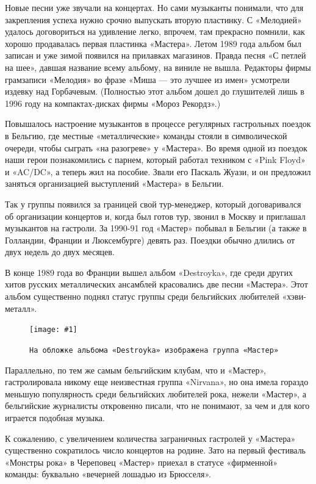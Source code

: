 \documentclass[10pt, twoside]{book}
\newcommand{\myincludegraphics}[1]{\texttt{[image: \#1]}}
\begin{document}
Новые песни уже звучали на концертах. Но сами музыканты понимали, что для закрепления успеха нужно срочно выпускать
вторую пластинку. С «Мелодией» удалось договориться на удивление легко, впрочем, там прекрасно помнили, как хорошо
продавалась первая пластинка «Мастера». Летом 1989 года альбом был записан и уже зимой появился на прилавках магазинов.
Правда песня «С петлей на шее», давшая название всему альбому, на виниле не вышла. Редакторы фирмы грамзаписи «Мелодия»
во фразе «Миша — это лучшее из имен» усмотрели издевку над Горбачевым. (Полностью этот альбом дошел до глушителей лишь в
1996 году на компактах-дисках фирмы «Мороз Рекордз».)

Повышалось настроение музыкантов в процессе регулярных гастрольных поездок в Бельгию, где местные «металлические»
команды стояли в символической очереди, чтобы сыграть «на разогреве» у «Мастера». Во время одной из поездок наши герои
познакомились с парнем, который работал техником с «Pink Floyd» и «AC/DC», а теперь жил на пособие. Звали его Паскаль
Жуази, и он предложил заняться организацией выступлений «Мастера» в Бельгии.

Так у группы появился за границей свой тур-менеджер, который договаривался об организации концертов и, когда был готов
тур, звонил в Москву и приглашал музыкантов на гастроли. За 1990-91 год «Мастер» побывал в Бельгии (а также в Голландии,
Франции и Люксембурге) девять раз. Поездки обычно длились от двух недель до двух месяцев.

В конце 1989 года во Франции вышел альбом «Destroyka», где среди других хитов русских металлических ансамблей
красовались две песни «Мастера». Этот альбом существенно поднял статус группы среди бельгийских любителей «хэви-металл».

\begin{figure}
    \centering
    \myincludegraphics{Image25}
    \caption{\texttt{На обложке альбома «Destroykа» изображена группа «Мастер»}}
\end{figure}

Параллельно, по тем же самым бельгийским клубам, что и «Мастер», гастролировала никому еще неизвестная группа «Nirvana»,
но она имела гораздо меньшую популярность среди бельгийских любителей рока, нежели «Мастер», а бельгийские журналисты
откровенно писали, что не понимают, за чем и для кого играется подобная музыка.

К сожалению, с увеличением количества заграничных гастролей у «Мастера» существенно сократилось число концертов на
родине. Зато на первый фестиваль «Монстры рока» в Череповец «Мастер» приехал в статусе «фирменной» команды: буквально
«вечерней лошадью из Брюсселя».
\end{document}
